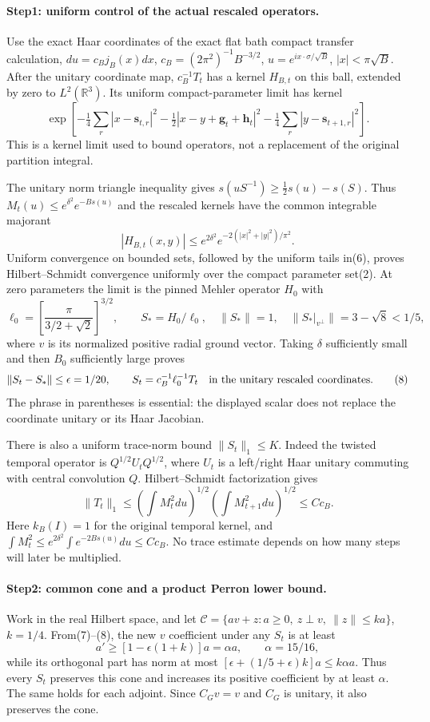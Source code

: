 \documentclass[11pt]{article}
\begin{document}
\paragraph{Step1: uniform control of the actual rescaled operators.}
Use the exact Haar coordinates of the exact flat bath compact transfer calculation,
$du=c_Bj_B(x)dx$, $c_B=(2\pi^2)^{-1}B^{-3/2}$,
$u=e^{i x\cdot\sigma/\sqrt B}$, $|x|<\pi\sqrt B$.
After the unitary coordinate map, $c_B^{-1}T_t$ has a kernel $H_{B,t}$ on this
ball, extended by zero to $L^2(\mathbb R^3)$.
Its uniform compact-parameter limit has kernel
\[
 \exp\left[-\tfrac14\sum_r|x-\mathbf s_{t,r}|^2
            -\tfrac12|x-y+\mathbf g_t+\mathbf h_t|^2
            -\tfrac14\sum_r|y-\mathbf s_{t+1,r}|^2\right].       \tag{5}
\]
This is a kernel limit used to bound operators, not a replacement of the original
partition integral.

The unitary norm triangle inequality gives
$s(uS^{-1})\ge\tfrac12s(u)-s(S)$. Thus
$M_t(u)\le e^{\delta^2}e^{-Bs(u)}$ and the rescaled kernels have the common
integrable majorant
\[
 |H_{B,t}(x,y)|\le e^{2\delta^2}
              e^{-2(|x|^2+|y|^2)/\pi^2}.              \tag{6}
\]
Uniform convergence on bounded sets, followed by the uniform tails in(6), proves
Hilbert--Schmidt convergence uniformly over the compact parameter set(2).
At zero parameters the limit is the pinned Mehler operator $H_0$ with
\[
 \ell_0=\left[\frac\pi{3/2+\sqrt2}\right]^{3/2},\qquad
 S_*=H_0/\ell_0,\quad \|S_*\|=1,\quad
 \|S_*|_{v^\perp}\|=3-\sqrt8<1/5,                   \tag{7}
\]
where $v$ is its normalized positive radial ground vector. Taking $\delta$
sufficiently small and then $B_0$ sufficiently large proves
\[
 \|S_t-S_*\|\le\epsilon=1/20,
 \qquad S_t=c_B^{-1}\ell_0^{-1}T_t
 \quad\hbox{in the unitary rescaled coordinates}.     \tag{8}
\]
The phrase in parentheses is essential: the displayed scalar does not replace
the coordinate unitary or its Haar Jacobian.

There is also a uniform trace-norm bound $\|S_t\|_1\le K$.
Indeed the twisted temporal operator is $Q^{1/2}U_tQ^{1/2}$, where $U_t$ is a
left/right Haar unitary commuting with central convolution $Q$.
Hilbert--Schmidt factorization gives
\[
 \|T_t\|_1\le
  (\int M_t^2du)^{1/2}(\int M_{t+1}^2du)^{1/2}
 \le C c_B.                                         \tag{9}
\]
Here $k_B(I)=1$ for the original temporal kernel, and
$\int M_t^2\le e^{2\delta^2}\int e^{-2Bs(u)}du\le Cc_B$.
No trace estimate depends on how many steps will later be multiplied.

\paragraph{Step2: common cone and a product Perron lower bound.}
Work in the real Hilbert space, and let
$\mathcal C=\{a v+z:a\ge0,\ z\perp v,\ \|z\|\le k a\}$, $k=1/4$.
From(7)--(8), the new $v$ coefficient under any $S_t$ is at least
\[
 a'\ge[1-\epsilon(1+k)]a=\alpha a,\qquad\alpha=15/16,
\]
while its orthogonal part has norm at most
$[\epsilon+(1/5+\epsilon)k]a\le k\alpha a$.
Thus every $S_t$ preserves this cone and increases its positive coefficient by
at least $\alpha$. The same holds for each adjoint. Since $C_Gv=v$ and $C_G$
is unitary, it also preserves the cone.
\end{document}
